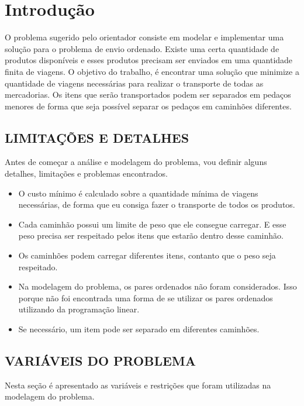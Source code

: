 \chapter{Introdução}


O problema sugerido pelo orientador consiste em modelar e implementar uma solução para o problema de envio ordenado. Existe uma certa quantidade de produtos disponíveis e esses produtos precisam ser enviados em uma quantidade finita de viagens. O objetivo do trabalho, é encontrar uma solução que minimize a quantidade de viagens necessárias para realizar o transporte de todas as mercadorias. Os itens que serão transportados podem ser separados em pedaços menores de forma que seja possível separar os pedaços em caminhões diferentes.

\section{LIMITAÇÕES E DETALHES}
  Antes de começar a análise e modelagem do problema, vou definir alguns detalhes, limitações e problemas encontrados. 
  \begin{itemize}
    \item O custo mínimo é calculado sobre a quantidade mínima de viagens necessárias, de forma que eu consiga fazer o transporte de todos os produtos. 
    \item Cada caminhão possui um limite de peso que ele consegue carregar. E esse peso precisa ser respeitado pelos itens que estarão dentro desse caminhão. 
    \item Os caminhões podem carregar diferentes itens, contanto que o peso seja respeitado. 
    \item Na modelagem do problema, os pares ordenados não foram considerados. Isso porque não foi encontrada uma forma de se utilizar os pares ordenados utilizando da programação linear.
    \item Se necessário, um item pode ser separado em diferentes caminhões.
  \end{itemize}

\section{VARIÁVEIS DO PROBLEMA}
  Nesta seção é apresentado as variáveis e restrições que foram utilizadas na modelagem do problema.

